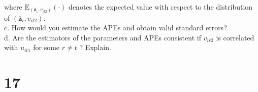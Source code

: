 \documentclass[10pt]{article}
\begin{document}
where $\mathrm{E}_{\left(\overline{\mathbf{z}}_{i}, v_{i t 2}\right)}(\cdot)$ denotes the expected value with respect to the distribution of $\left(\overline{\mathbf{z}}_{i}, v_{i t 2}\right)$.\\
c. How would you estimate the APEs and obtain valid standard errors?\\
d. Are the estimators of the parameters and APEs consistent if $v_{i r 2}$ is correlated with $u_{i t 1}$ for some $r \neq t$ ? Explain.

\section*{17}
\end{document}
